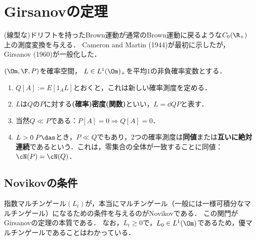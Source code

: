 \documentclass[uplatex,dvipdfmx]{jsreport}
\begin{document}
\section{Girsanovの定理}

\begin{tcolorbox}[colframe=ForestGreen, colback=ForestGreen!10!white,breakable,colbacktitle=ForestGreen!40!white,coltitle=black,fonttitle=\bfseries\sffamily,
title=]
    (線型な)ドリフトを持ったBrown運動が通常のBrown運動に戻るような$C_0(\R_+)$上の測度変換を与える．
    Cameron and Martin (1944)が最初に示したが，Girsanov (1960)が一般化した．
\end{tcolorbox}

\begin{definition}
    $(\Om,\F,P)$を確率空間，
    $L\in L^1(\Om)_+$を平均$1$の非負確率変数とする．
    \begin{enumerate}
        \item $Q[A]:=E[1_AL]$とおくと，これは新しい確率測度を定める．
        \item $L$は$Q$の$P$に対する\textbf{(確率)密度(関数)}といい，$L=\dd{Q}{P}$と表す．
        \item 当然$Q\ll P$である：$P[A]=0\Rightarrow Q[A]=0$．
        \item $L>0\;P\das$とき，$P\ll Q$でもあり，2つの確率測度は\textbf{同値}または\textbf{互いに絶対連続}であるという．これは，零集合の全体が一致することに同値：$\cN(P)=\cN(Q)$．
    \end{enumerate}
\end{definition}

\subsection{Novikovの条件}

\begin{tcolorbox}[colframe=ForestGreen, colback=ForestGreen!10!white,breakable,colbacktitle=ForestGreen!40!white,coltitle=black,fonttitle=\bfseries\sffamily,
title=]
    指数マルチンゲール$(L_t)$が，本当にマルチンゲール（一般には一様可積分なマルチンゲール）になるための条件を与えるのがNovikovである．
    この関門がGirsanovの定理の本質である．
    なお，$L_t\ge0$で，$L_0\in L^1(\Om)$であるため，優マルチンゲールであることはわかっている．
\end{tcolorbox}
\end{document}

